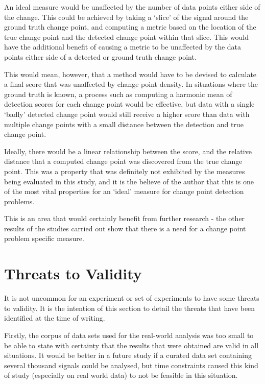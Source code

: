 \documentclass{uvamscse}	%
\begin{document}
An ideal measure would be unaffected by the number of data points either side of the change. This could be achieved by taking a `slice' of the signal around the ground truth change point, and computing a metric based on the location of the true change point and the detected change point within that slice. This would have the additional benefit of causing a metric to be unaffected by the data points either side of a detected or ground truth change point.

This would mean, however, that a method would have to be devised to calculate a final score that was unaffected by change point density. In situations where the ground truth is known, a process such as computing a harmonic mean of detection scores for each change point would be effective, but data with a single `badly' detected change point would still receive a higher score than data with multiple change points with a small distance between the detection and true change point.

Ideally, there would be a linear relationship between the score, and the relative distance that a computed change point was discovered from the true change point. This was a property that was definitely not exhibited by the measures being evaluated in this study, and it is the believe of the author that this is one of the most vital properties for an `ideal' measure for change point detection problems.

This is an area that would certainly benefit from further research - the other results of the studies carried out show that there is a need for a change point problem specific measure.

\section{Threats to Validity}
\label{threats}

It is not uncommon for an experiment or set of experiments to have some threats to validity. It is the intention of this section to detail the threats that have been identified at the time of writing.

Firstly, the corpus of data sets used for the real-world analysis was too small to be able to state with certainty that the results that were obtained are valid in all situations. It would be better in a future study if a curated data set containing several thousand signals could be analysed, but time constraints caused this kind of study (especially on real world data) to not be feasible in this situation.
\end{document}
